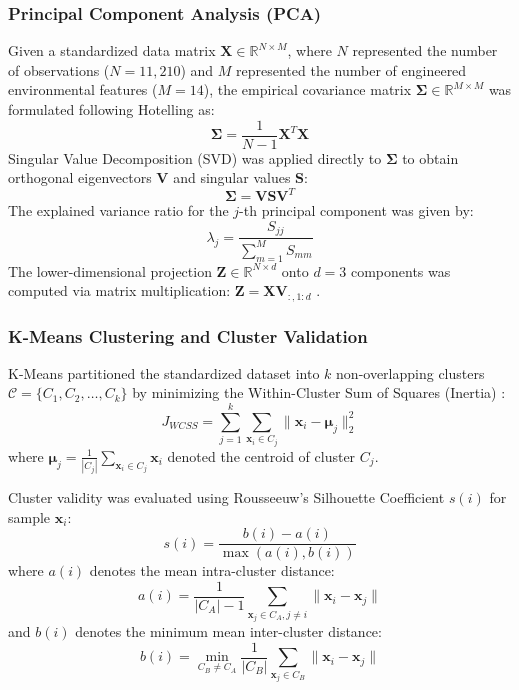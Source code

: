 \documentclass[conference]{IEEEtran}
\begin{document}
\subsubsection{Principal Component Analysis (PCA)}
Given a standardized data matrix $\mathbf{X} \in \mathbb{R}^{N \times M}$, where $N$ represented the number of observations ($N=11,210$) and $M$ represented the number of engineered environmental features ($M=14$), the empirical covariance matrix $\mathbf{\Sigma} \in \mathbb{R}^{M \times M}$ was formulated following Hotelling \cite{hotelling1933} as:
\begin{equation}
\mathbf{\Sigma} = \frac{1}{N-1} \mathbf{X}^T \mathbf{X}
\end{equation}
Singular Value Decomposition (SVD) was applied directly to $\mathbf{\Sigma}$ to obtain orthogonal eigenvectors $\mathbf{V}$ and singular values $\mathbf{S}$:
\begin{equation}
\mathbf{\Sigma} = \mathbf{V} \mathbf{S} \mathbf{V}^T
\end{equation}
The explained variance ratio for the $j$-th principal component was given by:
\begin{equation}
\lambda_j = \frac{S_{jj}}{\sum_{m=1}^M S_{mm}}
\end{equation}
The lower-dimensional projection $\mathbf{Z} \in \mathbb{R}^{N \times d}$ onto $d=3$ components was computed via matrix multiplication: $\mathbf{Z} = \mathbf{X} \mathbf{V}_{:, 1:d}$ \cite{hotelling1933}.

\subsubsection{K-Means Clustering and Cluster Validation}
K-Means partitioned the standardized dataset into $k$ non-overlapping clusters $\mathcal{C} = \{C_1, C_2, \dots, C_k\}$ by minimizing the Within-Cluster Sum of Squares (Inertia) \cite{macqueen1967}:
\begin{equation}
J_{WCSS} = \sum_{j=1}^k \sum_{\mathbf{x}_i \in C_j} \|\mathbf{x}_i - \boldsymbol{\mu}_j\|_2^2
\end{equation}
where $\boldsymbol{\mu}_j = \frac{1}{|C_j|} \sum_{\mathbf{x}_i \in C_j} \mathbf{x}_i$ denoted the centroid of cluster $C_j$.

Cluster validity was evaluated using Rousseeuw's Silhouette Coefficient $s(i)$ \cite{rousseeuw1987} for sample $\mathbf{x}_i$:
\begin{equation}
s(i) = \frac{b(i) - a(i)}{\max(a(i), b(i))}
\end{equation}
where $a(i)$ denotes the mean intra-cluster distance:
\begin{equation}
a(i) = \frac{1}{|C_A|-1} \sum_{\mathbf{x}_j \in C_A, j \ne i} \|\mathbf{x}_i - \mathbf{x}_j\|
\end{equation}
and $b(i)$ denotes the minimum mean inter-cluster distance:
\begin{equation}
b(i) = \min_{C_B \ne C_A} \frac{1}{|C_B|} \sum_{\mathbf{x}_j \in C_B} \|\mathbf{x}_i - \mathbf{x}_j\|
\end{equation}
\end{document}
